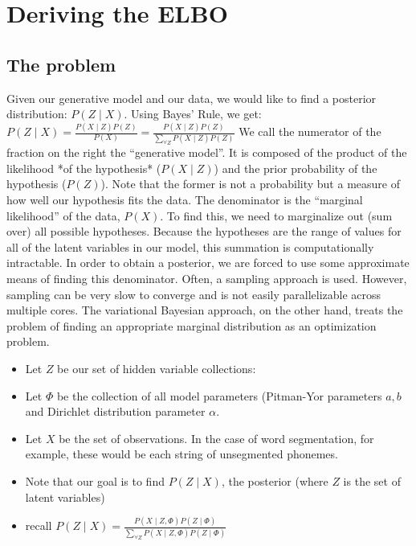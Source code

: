 
\section{Deriving the ELBO}

\subsection{The problem}

Given our generative model and our data, we would
like to find a posterior distribution: $P(Z \mid  X)$. Using
Bayes’ Rule, we get:
$P(Z\mid X) = \frac{P(X\mid Z)P(Z)}{P(X)} = \frac{P(X\mid Z)P(Z)}{\sum\limits_{\forall Z} P(X\mid Z) P(Z)}$
We call the numerator of the fraction on the right the “generative
model”. It is composed of the product of the likelihood *of the
hypothesis* ($P(X\mid Z)$) and the prior probability of the hypothesis
($P(Z)$). Note that the former is not a probability but a measure of how
well our hypothesis fits the data. The denominator is the ``marginal
likelihood'' of the data, $P(X)$. To find this, we need to marginalize
out (sum over) all possible hypotheses. Because the hypotheses are the
range of values for all of the latent variables in our model, this
summation is computationally intractable. In order to obtain a
posterior, we are forced to use some approximate means of finding this
denominator. Often, a sampling approach is used. However, sampling can
be very slow to converge and is not easily parallelizable across
multiple cores. The variational Bayesian approach, on the other hand,
treats the problem of finding an appropriate marginal distribution as an
optimization problem.

 \begin{itemize}
\item   Let $Z$ be our set of hidden variable collections: 
\item   Let $\Phi$ be the collection of all model parameters (Pitman-Yor
    parameters $a,b$ and Dirichlet distribution parameter $\alpha$.
\item   Let $X$ be the set of observations. In the case of word
    segmentation, for example, these would be each string of unsegmented
    phonemes.
\item   Note that our goal is to find $P(Z\mid X)$, the posterior (where $Z$ is
    the set of latent variables)
\item  recall $P(Z\mid X) = \frac{P(X\mid Z, \Phi)P(Z \mid  \Phi)}{\sum\limits_{\forall Z} P(X\mid Z, \Phi) P(Z\mid \Phi) } $ 
\end{itemize}

